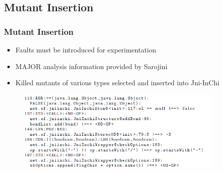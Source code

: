 \documentclass{beamer}
\begin{document}
	\subsection{Mutant Insertion}
	\begin{frame}
	\frametitle{Mutant Insertion}
	\begin{itemize}
		\item Faults must be introduced for experimentation
		\pause
		\item MAJOR analysis information provided by Sarojini
		\pause
		\item Killed mutants of various types selected and inserted into Jni-InChi
	\end{itemize}
	
	\begin{figure}
		\label{mutants}
		\includegraphics[width=4in]{img/mutants}
	\end{figure}
	
	\end{frame}
\end{document}
